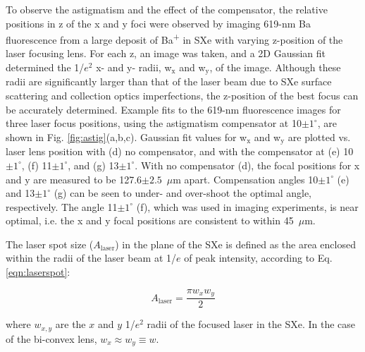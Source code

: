 To observe the astigmatism and the effect of the compensator, the relative positions in z of the x and y foci were observed by imaging 619-nm Ba fluorescence from a large deposit of Ba\textsuperscript{+} in SXe with varying z-position of the laser focusing lens.  For each z, an image was taken, and a 2D Gaussian fit determined the 1/$e^{2}$ x- and y- radii, w$_{\text{x}}$ and w$_{\text{y}}$, of the image.  Although these radii are significantly larger than that of the laser beam due to SXe surface scattering and collection optics imperfections, the z-position of the best focus can be accurately determined.  Example fits to the 619-nm fluorescence images for three laser focus positions, using the astigmatism compensator at 10$\pm 1^{\circ}$, are shown in Fig. \ref{fig:astig}(a,b,c).  Gaussian fit values for w$_{\text{x}}$ and w$_{\text{y}}$ are plotted vs. laser lens position with (d) no compensator, and with the compensator at (e) 10$\pm 1^{\circ}$, (f) 11$\pm 1^{\circ}$, and (g) 13$\pm 1^{\circ}$.  With no compensator (d), the focal positions for x and y are measured to be 127.6$ \pm 2.5$~$\mu$m apart.  Compensation angles 10$\pm 1^{\circ}$ (e) and 13$\pm 1^{\circ}$ (g) can be seen to under- and over-shoot the optimal angle, respectively.  The angle 11$\pm 1^{\circ}$ (f), which was used in imaging experiments, is near optimal, i.e. the x and y focal positions are consistent to within 45~$\mu$m.  %

The laser spot size ($A_{\text{laser}}$) in the plane of the SXe is defined as the area enclosed within the radii of the laser beam at 1/$e$ of peak intensity, according to Eq. \ref{eqn:laserspot}:

\begin{equation}
A_{\text{laser}} = \frac{\pi w_{x} w_{y}}{2}
\label{eqn:laserspot}
\end{equation}

\noindent
where $w_{x,y}$ are the $x$ and $y$ 1/$e^{2}$ radii of the focused laser in the SXe.  In the case of the bi-convex lens, $w_{x} \approx w_{y} \equiv w$.



